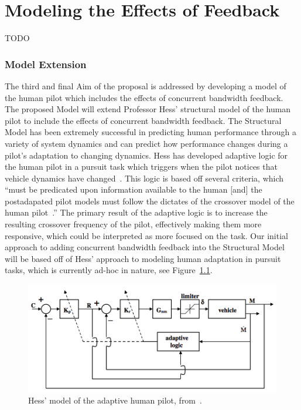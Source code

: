 \chapter{Modeling the Effects of Feedback}
\label{chapter:modeling}
TODO

\subsection{Model Extension}
The third and final Aim of the proposal is addressed by developing a model of the human pilot which includes the effects of concurrent bandwidth feedback.
The proposed Model will extend Professor Hess' structural model of the human pilot to include the effects of concurrent bandwidth feedback.
The Structural Model has been extremely successful in predicting human performance through a variety of system dynamics and can predict how performance changes during a pilot's adaptation to changing dynamics.
Hess has developed adaptive logic for the human pilot in a pursuit task which triggers when the pilot notices that vehicle dynamics have changed~\citep{hess_modeling_2009}.
This logic is based off several criteria, which ``must be predicated upon information available to the human [and] the postadapated pilot models must follow the dictates of the crossover model of the human pilot~\citep{hess_modeling_2009}.''
The primary result of the adaptive logic is to increase the resulting crossover frequency of the pilot, effectively making them more responsive, which could be interpreted as more focused on the task.
Our initial approach to adding concurrent bandwidth feedback into the Structural Model will be based off of Hess' approach to modeling human adaptation in pursuit tasks, which is currently ad-hoc in nature, see Figure~\ref{figure:hesspursuit}.

\begin{figure}[tb]
    \begin{center}
        \includegraphics[width=0.8\linewidth]{figures/Screen_Shot_2018-08-09_at_4_15_24_PM.png}
        \caption[Hess' model of the adaptive human pilot.]{Hess' model of the adaptive human pilot, from~\citep{hess_modeling_2009}.}
        \label{figure:hesspursuit}
    \end{center}
\end{figure}

